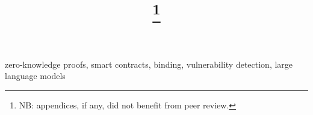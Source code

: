 \documentclass[compsoc,conference,a4paper,10pt,times]{IEEEtran}
\begin{document}
\title{\thanks{NB: appendices, if any, did not benefit from peer review.}}
\author{}
\maketitle
\begin{abstract}\end{abstract}
\begin{IEEEkeywords}
zero-knowledge proofs, smart contracts, binding, vulnerability detection, large language models
\end{IEEEkeywords}













\appendices

\end{document}
